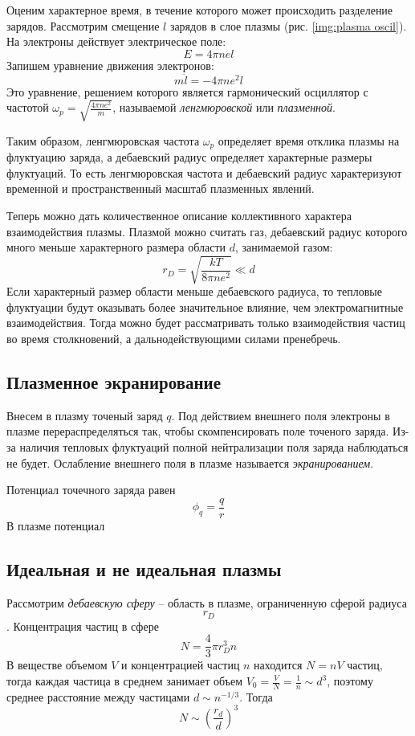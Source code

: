 Оценим характерное время, в течение которого может происходить разделение зарядов. Рассмотрим смещение $l$ зарядов в слое плазмы (рис. \ref{img:plasma oscil}). На электроны действует электрическое поле:
$$
E = 4 \pi n e l
$$
Запишем уравнение движения электронов:
$$m \ddot{l} = -4 \pi n e^2 l$$
Это уравнение, решением которого является гармонический осциллятор с частотой $\omega_p = \sqrt{\frac{4\pi n e^2}{m}}$, называемой \textit{ленгмюровской} или \textit{плазменной}. 

Таким образом, ленгмюровская частота $\omega_p$ определяет время отклика плазмы на флуктуацию заряда, а дебаевский радиус определяет характерные размеры флуктуаций. То есть ленгмюровская частота и дебаевский радиус характеризуют временной и пространственный масштаб плазменных явлений.

Теперь можно дать количественное описание коллективного характера взаимодействия плазмы. Плазмой можно считать газ, дебаевский радиус которого много меньше характерного размера области $d$, занимаемой газом:
$$
r_D = \sqrt{\frac{kT}{8 \pi n e^2}} \ll d
$$
Если характерный размер области меньше дебаевского радиуса, то тепловые флуктуации будут оказывать более значительное влияние, чем электромагнитные взаимодействия. Тогда можно будет рассматривать только взаимодействия частиц во время столкновений, а дальнодействующими силами пренебречь.

\subsection*{Плазменное экранирование}

Внесем в плазму точеный заряд $q$. Под действием внешнего поля электроны в плазме перераспределяться так, чтобы скомпенсировать поле точеного заряда. Из-за наличия тепловых флуктуаций полной нейтрализации поля заряда наблюдаться не будет. Ослабление внешнего поля в плазме называется \textit{экранированием}.

Потенциал точечного заряда равен
$$\phi_q = \frac{q}{r}$$
В плазме потенциал 

\subsection*{Идеальная и не идеальная плазмы}

Рассмотрим \textit{дебаевскую сферу} -- область в плазме, ограниченную сферой радиуса $$r_D$$. Концентрация частиц в сфере
$$N = \frac{4}{3} \pi r_D^3 n$$
В веществе объемом $V$ и концентрацией частиц $n$ находится $N = nV$ частиц, тогда каждая частица в среднем занимает объем $V_0 = \frac{V}{N} = \frac{1}{n} \sim d^3$, поэтому среднее расстояние между частицами $d \sim n^{-1/3}$. Тогда 
$$N \sim \left( \frac{r_d}{d} \right)^3$$

